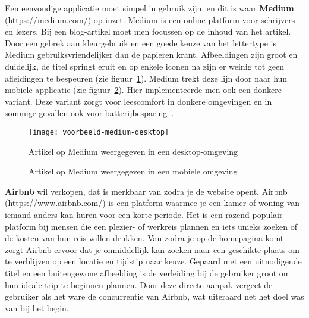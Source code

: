 Een eenvoudige applicatie moet simpel in gebruik zijn, en dit is waar \textbf{Medium} (\href{https://medium.com/@jtnakagawa/nothing-left-to-take-away-437eb23c2ae8}{https://medium.com/}) op inzet. Medium is een online platform voor schrijvers en lezers. Bij een blog-artikel moet men focussen op de inhoud van het artikel. Door een gebrek aan kleurgebruik en een goede keuze van het lettertype is Medium gebruiksvriendelijker dan de papieren krant. Afbeeldingen zijn groot en duidelijk, de titel springt eruit en op enkele iconen na zijn er weinig tot geen afleidingen te bespeuren (zie figuur~\ref{fig:ux-voorbeeld-medium:desktop}). Medium trekt deze lijn door naar hun mobiele applicatie (zie figuur~\ref{fig:ux-voorbeeld-medium:mobiel}). Hier implementeerde men ook een donkere variant. Deze variant zorgt voor leescomfort in donkere omgevingen en in sommige gevallen ook voor batterijbesparing~\autocite{Jin2017}.

\begin{figure}
    \centering
    \texttt{[image: voorbeeld-medium-desktop]}
    \caption[Voorbeeld Medium desktop]{Artikel op Medium weergegeven in een desktop-omgeving}
    \label{fig:ux-voorbeeld-medium:desktop}
\end{figure}

\begin{figure}
    \centering
    \qquad
    \caption[Voorbeeld Medium mobiel]{Artikel op Medium weergegeven in een mobiele omgeving}
    \label{fig:ux-voorbeeld-medium:mobiel}
\end{figure}

\textbf{Airbnb} wil verkopen, dat is merkbaar van zodra je de website opent. Airbnb (\url{https://www.airbnb.com/}) is een platform waarmee je een kamer of woning van iemand anders kan huren voor een korte periode. Het is een razend populair platform bij mensen die een plezier- of werkreis plannen en iets unieks zoeken of de kosten van hun reis willen drukken. Van zodra je op de homepagina komt zorgt Airbnb ervoor dat je onmiddellijk kan zoeken naar een geschikte plaats om te verblijven op een locatie en tijdstip naar keuze. Gepaard met een uitnodigende titel en een buitengewone afbeelding is de verleiding bij de gebruiker groot om hun ideale trip te beginnen plannen. Door deze directe aanpak vergeet de gebruiker als het ware de concurrentie van Airbnb, wat uiteraard net het doel was van bij het begin.

